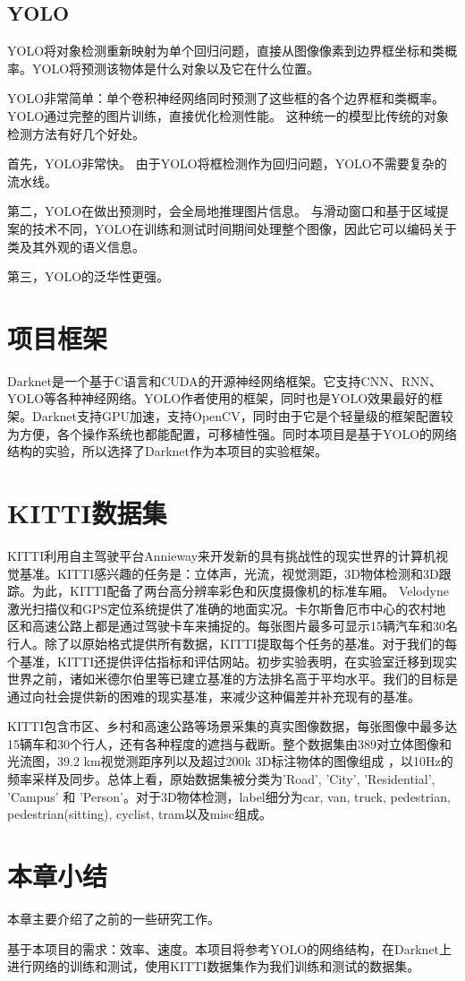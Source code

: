 \subsection{YOLO\cite{yolo}}{
YOLO将对象检测重新映射为单个回归问题，直接从图像像素到边界框坐标和类概率。YOLO将预测该物体是什么对象以及它在什么位置。

YOLO非常简单：单个卷积神经网络同时预测了这些框的各个边界框和类概率。YOLO通过完整的图片训练，直接优化检测性能。 这种统一的模型比传统的对象检测方法有好几个好处。

首先，YOLO非常快。 由于YOLO将框检测作为回归问题，YOLO不需要复杂的流水线。

第二，YOLO在做出预测时，会全局地推理图片信息。 与滑动窗口和基于区域提案的技术不同，YOLO在训练和测试时间期间处理整个图像，因此它可以编码关于类及其外观的语义信息。

第三，YOLO的泛华性更强。
}

\section{项目框架}{
	Darknet是一个基于C语言和CUDA的开源神经网络框架。它支持CNN、RNN、YOLO等各种神经网络。YOLO作者使用的框架，同时也是YOLO效果最好的框架。Darknet支持GPU加速，支持OpenCV，同时由于它是个轻量级的框架配置较为方便，各个操作系统也都能配置，可移植性强。同时本项目是基于YOLO的网络结构的实验，所以选择了Darknet作为本项目的实验框架。
}

\section{KITTI数据集}{
	KITTI利用自主驾驶平台Annieway来开发新的具有挑战性的现实世界的计算机视觉基准。KITTI感兴趣的任务是：立体声，光流，视觉测距，3D物体检测和3D跟踪。为此，KITTI配备了两台高分辨率彩色和灰度摄像机的标准车厢。 Velodyne激光扫描仪和GPS定位系统提供了准确的地面实况。卡尔斯鲁厄市中心的农村地区和高速公路上都是通过驾驶卡车来捕捉的。每张图片最多可显示15辆汽车和30名行人。除了以原始格式提供所有数据，KITTI提取每个任务的基准。对于我们的每个基准，KITTI还提供评估指标和评估网站。初步实验表明，在实验室迁移到现实世界之前，诸如米德尔伯里等已建立基准的方法排名高于平均水平。我们的目标是通过向社会提供新的困难的现实基准，来减少这种偏差并补充现有的基准。

	KITTI包含市区、乡村和高速公路等场景采集的真实图像数据，每张图像中最多达15辆车和30个行人，还有各种程度的遮挡与截断。整个数据集由389对立体图像和光流图，39.2 km视觉测距序列以及超过200k 3D标注物体的图像组成 ，以10Hz的频率采样及同步。总体上看，原始数据集被分类为’Road’, ’City’, ’Residential’, ’Campus’ 和 ’Person’。对于3D物体检测，label细分为car, van, truck, pedestrian, pedestrian(sitting), cyclist, tram以及misc组成。
}

\section{本章小结}{
	本章主要介绍了之前的一些研究工作。

	基于本项目的需求：效率、速度。本项目将参考YOLO的网络结构，在Darknet上进行网络的训练和测试，使用KITTI数据集作为我们训练和测试的数据集。
}

